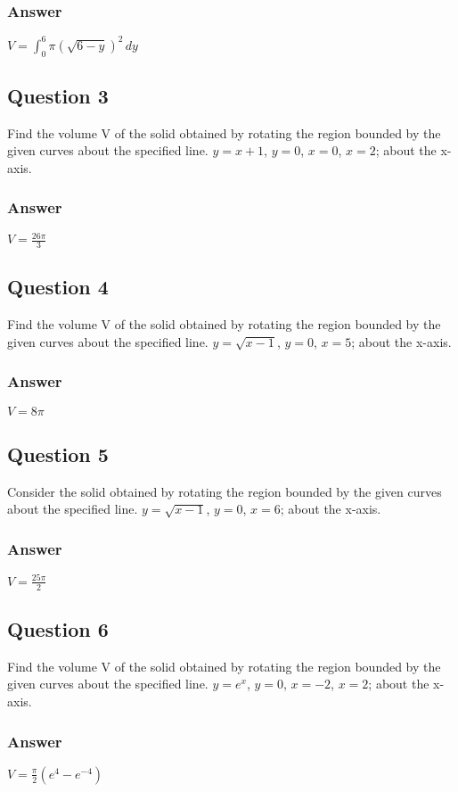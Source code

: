 \documentclass{article}
\begin{document}
\subsubsection*{Answer}
$ V = \int_0^6 \pi(\sqrt{6-y})^2 \,dy $

\subsection*{Question 3}
Find the volume V of the solid obtained by rotating the region bounded by the given curves about the specified line. $y=x+1$, $y=0$, $x=0$, $x=2$; about the x-axis.
\subsubsection*{Answer}
$ V = \frac{26\pi}{3} $

\subsection*{Question 4}
Find the volume V of the solid obtained by rotating the region bounded by the given curves about the specified line. $y=\sqrt{x-1}$, $y=0$, $x=5$; about the x-axis.
\subsubsection*{Answer}
$ V = 8\pi $

\subsection*{Question 5}
Consider the solid obtained by rotating the region bounded by the given curves about the specified line. $y=\sqrt{x-1}$, $y=0$, $x=6$; about the x-axis.
\subsubsection*{Answer}
$ V = \frac{25\pi}{2} $

\subsection*{Question 6}
Find the volume V of the solid obtained by rotating the region bounded by the given curves about the specified line. $y=e^x$, $y=0$, $x=-2$, $x=2$; about the x-axis.
\subsubsection*{Answer}
$ V = \frac{\pi}{2}(e^4 - e^{-4}) $
\end{document}
